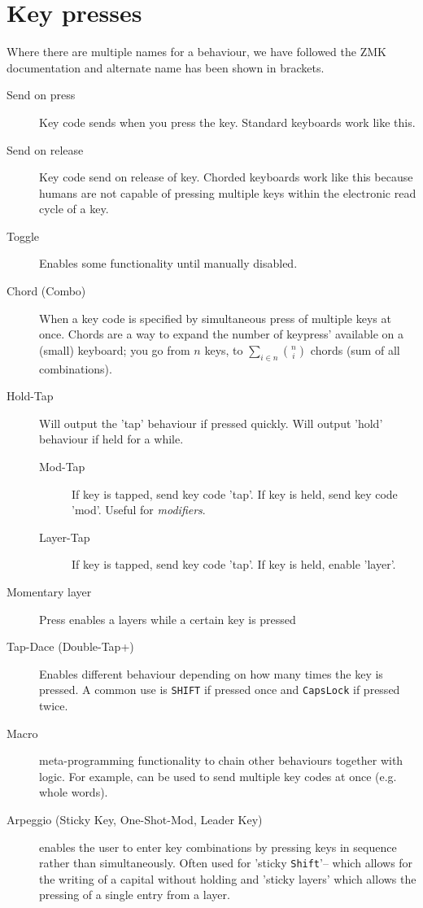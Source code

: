 \documentclass[logo,bsc,singlespacing,parskip]{infthesis}
\begin{document}
\section{Key presses}
\label{sec:orgbb8a09a}
Where there are multiple names for a behaviour, we have followed the ZMK \autocite{ZMKFirmware} documentation and alternate name has been shown in brackets.

\begin{mdframed}
\begin{description}
\item[{Send on press}] Key code sends when you press the key.
Standard keyboards work like this.
\item[{Send on release}] Key code send on release of key.
Chorded keyboards work like this because humans are not capable of pressing multiple keys within the electronic read cycle of a key.
\item[{Toggle}] Enables some functionality until manually disabled.
\item[{Chord (Combo)}] When a key code is specified by simultaneous press of multiple keys at once.
Chords are a way to expand the number of keypress' available on a (small) keyboard; you go from \(n\) keys, to \(\sum_{i \in n}{ n \choose i}\) chords (sum of all combinations).
\item[{Hold-Tap}] Will output the 'tap' behaviour if pressed quickly. Will output 'hold' behaviour if held for a while.
\begin{description}
\item[{Mod-Tap}] If key is tapped, send key code 'tap'. If key is held, send key code 'mod'. Useful for \emph{modifiers}.
\item[{Layer-Tap}] If key is tapped, send key code 'tap'. If key is held, enable 'layer'.
\end{description}
\item[{Momentary layer}] Press enables a layers while a certain key is pressed
\item[{Tap-Dace (Double-Tap+)}] Enables different behaviour depending on how many times the key is pressed. A common use is \texttt{SHIFT} if pressed once and \texttt{CapsLock} if pressed twice.
\item[{Macro}] meta-programming functionality to chain other behaviours together with logic.
For example, can be used to send multiple key codes at once (e.g. whole words).
\item[{Arpeggio (Sticky Key, One-Shot-Mod, Leader Key)}] enables the user to enter key combinations by pressing keys in sequence rather than simultaneously.
Often used for 'sticky \texttt{Shift}'-- which allows for the writing of a capital without holding and 'sticky layers' which allows the pressing of a single entry from a layer.
\end{description}
\end{mdframed}
\end{document}
